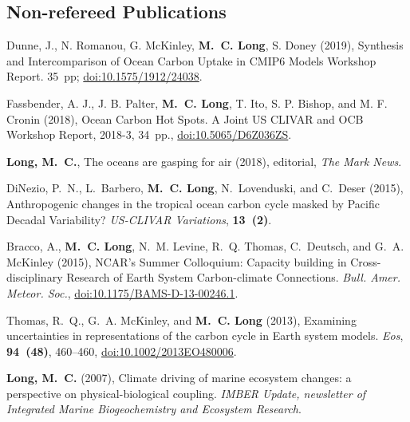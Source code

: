 \documentclass[11pt]{article}
\newcommand{\doi}[1]{\href{http://dx.doi.org/#1}{doi:#1}}
\newcommand{\publink}[1]{}
\begin{document}
\subsection*{Non-refereed Publications}

\vspace{-1em}
\begin{thebibliography}{99}

Dunne, J., N. Romanou, G. McKinley, \textbf{M.~C. Long}, S. Doney (2019), Synthesis and Intercomparison of Ocean Carbon Uptake in CMIP6 Models Workshop Report. 35~pp; \doi{10.1575/1912/24038}.

Fassbender, A. J., J. B. Palter, \textbf{M.~C. Long}, T. Ito, S. P. Bishop, and M. F. Cronin (2018), Ocean Carbon Hot Spots. A Joint US CLIVAR
and OCB Workshop Report, 2018-3, 34~pp., \doi{10.5065/D6Z036ZS}.

\textbf{Long, M.~C.}, The oceans are gasping for air (2018), editorial, \textit{The Mark News}.

{DiNezio}, P.~N., L.~{Barbero}, \textbf{M.~C. Long}, N.~{Lovenduski}, and C.~Deser (2015), {Anthropogenic changes in the tropical ocean carbon cycle masked by Pacific Decadal Variability?} \textit{US-CLIVAR Variations},  \textbf{13~(2)}.
\publink{DiNezio-Barbero-etal-2015}

Bracco, A., \textbf{M.~C. Long}, N.~M. Levine, R.~Q. Thomas, C.~{Deutsch}, and G.~A. McKinley (2015), {NCAR's Summer Colloquium: Capacity building in Cross-disciplinary Research of Earth System Carbon-climate Connections}. \textit{Bull. Amer. Meteor. Soc.}, \doi{10.1175/BAMS-D-13-00246.1}.
\publink{Bracco-Long-etal-2015}

Thomas, R.~Q., G.~A. McKinley, and \textbf{M.~C. Long} (2013), Examining uncertainties in representations of the carbon cycle in Earth system models. \textit{Eos}, \textbf{94~(48)}, 460--460, \doi{10.1002/2013EO480006}.

\textbf{Long, M.~C.} (2007),
Climate driving of marine ecosystem changes: a perspective on
physical-biological coupling. {\em IMBER Update, newsletter of Integrated Marine
Biogeochemistry and Ecosystem Research}.

\end{thebibliography}

\bigskip
\mydate
\rightline{\today}
\end{document}

